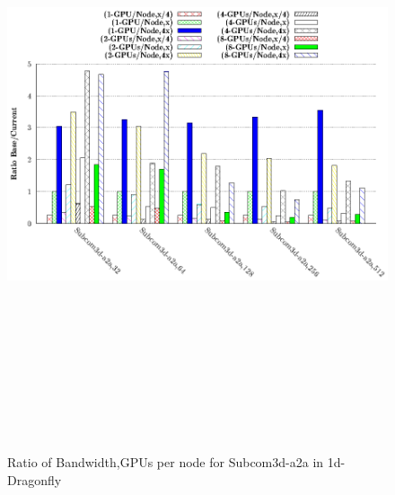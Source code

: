 \documentclass[final]{beamer}
\newlength{\onecolwid}
\newlength{\twocolwid}
\begin{document}
\begin{frame}[t]
\begin{columns}[t]
\begin{column}{\twocolwid}
\begin{columns}[t,totalwidth=\twocolwid]
\begin{column}{\onecolwid}
\begin{figure}
\centering
\begin{minipage}{1\textwidth}
\centering
\includegraphics[width=1\linewidth, height=18cm]{figs/dfly-bw-mapping-comm-subcom.eps}
\captionsetup{labelformat=empty}
\caption{Ratio of Bandwidth,GPUs per node for Subcom3d-a2a in 1d-Dragonfly}
\end{minipage}
\end{figure}
\begin{figure}
\centering
\begin{minipage}{1\textwidth}
\centering

\end{minipage}
\end{figure}
\end{column}
\end{columns}
\end{column}
\end{columns}
\end{frame}
\end{document}
